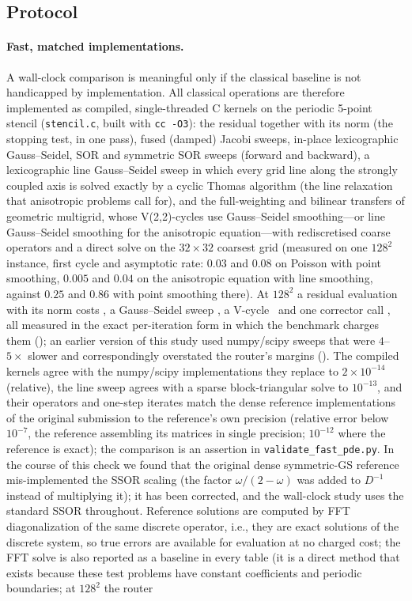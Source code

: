 \subsection{Protocol} \label{sec:wallclock_protocol}

\paragraph{Fast, matched implementations.} A wall-clock comparison is meaningful only if the classical baseline is not handicapped by implementation. All classical operations are therefore implemented as compiled, single-threaded C kernels on the periodic 5-point stencil (\texttt{stencil.c}, built with \texttt{cc -O3}): the residual together with its norm (the stopping test, in one pass), fused (damped) Jacobi sweeps, in-place lexicographic Gauss--Seidel, SOR and symmetric SOR sweeps (forward and backward), a lexicographic line Gauss--Seidel sweep in which every grid line along the strongly coupled axis is solved exactly by a cyclic Thomas algorithm (the line relaxation that anisotropic problems call for), and the full-weighting and bilinear transfers of geometric multigrid, whose V(2,2)-cycles use Gauss--Seidel smoothing---or line Gauss--Seidel smoothing for the anisotropic equation---with rediscretised coarse operators and a direct solve on the $32\times 32$ coarsest grid (measured on one $128^2$ instance, first cycle and asymptotic rate: $0.03$ and $0.08$ on Poisson with point smoothing, $0.005$ and $0.04$ on the anisotropic equation with line smoothing, against $0.25$ and $0.86$ with point smoothing there). At $128^2$ a residual evaluation with its norm costs \caCostRes, a Gauss--Seidel sweep \caCostGs, a V-cycle \caCostMg\ and one corrector call \caCostNo, all measured in the exact per-iteration form in which the benchmark charges them (); an earlier version of this study used numpy/scipy sweeps that were $4$--$5\times$ slower and correspondingly overstated the router's margins (). The compiled kernels agree with the numpy/scipy implementations they replace to $2\times10^{-14}$ (relative), the line sweep agrees with a sparse block-triangular solve to $10^{-13}$, and their operators and one-step iterates match the dense reference implementations of the original submission to the reference's own precision (relative error below $10^{-7}$, the reference assembling its matrices in single precision; $10^{-12}$ where the reference is exact); the comparison is an assertion in \texttt{validate\_fast\_pde.py}. In the course of this check we found that the original dense symmetric-GS reference mis-implemented the SSOR scaling (the factor $\omega/(2-\omega)$ was added to $D^{-1}$ instead of multiplying it); it has been corrected, and the wall-clock study uses the standard SSOR throughout. Reference solutions are computed by FFT diagonalization of the same discrete operator, i.e., they are exact solutions of the discrete system, so true errors are available for evaluation at no charged cost; the FFT solve is also reported as a baseline in every table (it is a direct method that exists because these test problems have constant coefficients and periodic boundaries; at $128^2$ the router 